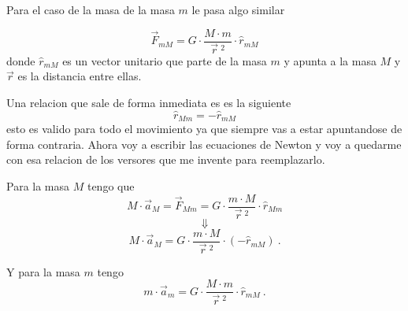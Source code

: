 \documentclass[../Main.tex]{subfiles}
\begin{document}
\npage{
}
{
    Para el caso de la masa de la masa $m$ le pasa algo similar

    \begin{equation*}
        \vec{F}_{mM} = G \cdot \frac{M \cdot m}{\vec{r} \ ^2} \cdot \hat{r}_{mM}
    \end{equation*}
    donde $\hat{r}_{mM}$ es un vector unitario que parte de la masa $m$ y apunta a
    la masa $M$ y $\vec{r}$ es la distancia entre ellas.

    Una relacion que sale de forma inmediata es es la siguiente 
    \begin{equation*}
        \hat{r}_{Mm} = - \hat{r}_{mM}
    \end{equation*}
    esto es valido para todo el movimiento ya que siempre vas a estar apuntandose
    de forma contraria. Ahora voy a escribir las ecuaciones de Newton y voy a
    quedarme con esa relacion de los versores que me invente para reemplazarlo.

    Para la masa $M$ tengo que
    \begin{equation*}
        M \cdot \vec{a}_M = \vec{F}_{Mm} = G \cdot \frac{m \cdot M}{\vec{r} \ ^2} \cdot \hat{r}_{Mm}
    \end{equation*}
    \begin{equation*}
        \Downarrow
    \end{equation*}
    \begin{equation*}
        M \cdot \vec{a}_M = G \cdot \frac{m \cdot M}{\vec{r} \ ^2} \cdot \left( - \hat{r}_{mM} \right) \ .
    \end{equation*}

    Y para la masa $m$ tengo
    \begin{equation*}
        m \cdot \vec{a}_m = G \cdot \frac{M \cdot m}{\vec{r} \ ^2} \cdot \hat{r}_{mM} \ .
    \end{equation*}

}
\end{document}
